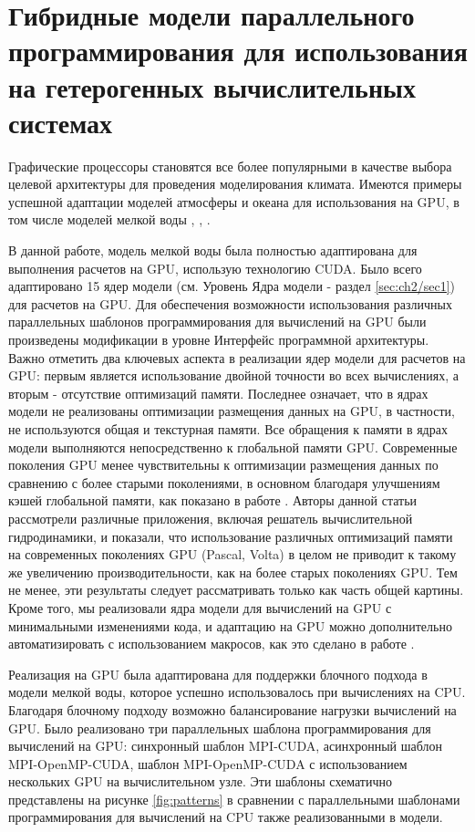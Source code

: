 \section{Гибридные модели параллельного программирования для использования на гетерогенных вычислительных системах}\label{sec:ch2/sec5}

Графические процессоры становятся все более популярными в качестве выбора целевой архитектуры для проведения моделирования климата. 
Имеются примеры успешной адаптации моделей атмосферы и океана для использования на GPU, в том числе моделей мелкой воды \cite{plosSW}, \cite{VOLNA}, \cite{gpuPOM}.

В данной работе, модель мелкой воды была полностью адаптирована для выполнения расчетов на GPU, использую технологию CUDA. 
Было всего адаптировано 15 ядер модели (см. Уровень Ядра модели - раздел \ref{sec:ch2/sec1}) для расчетов на GPU.
Для обеспечения возможности использования различных параллельных шаблонов программирования для вычислений на GPU были произведены модификации в уровне Интерфейс программной архитектуры.
Важно отметить два ключевых аспекта в реализации ядер модели для расчетов на GPU: первым является использование двойной точности во всех вычислениях, а вторым - отсутствие оптимизаций памяти.
Последнее означает, что в ядрах модели не реализованы оптимизации размещения данных на GPU, в частности, не используются общая и текстурная памяти. 
Все обращения к памяти в ядрах модели выполняются непосредственно к глобальной памяти GPU. 
Современные поколения GPU менее чувствительны к оптимизации размещения данных по сравнению с более старыми поколениями, в основном благодаря улучшениям кэшей глобальной памяти, как показано в работе \cite{CUDAopt}.
Авторы данной статьи рассмотрели различные приложения, включая решатель вычислительной гидродинамики, и показали, что использование различных оптимизаций памяти на современных поколениях GPU (Pascal, Volta) в целом не приводит к такому же увеличению производительности, как на более старых поколениях GPU.
Тем не менее, эти результаты следует рассматривать только как часть общей картины. 
Кроме того, мы реализовали ядра модели для вычислений на GPU с минимальными изменениями кода, и адаптацию на GPU можно дополнительно автоматизировать с использованием макросов, как это сделано в работе \cite{gmd-11-3447-2018}.

Реализация на GPU была адаптирована для поддержки блочного подхода в модели мелкой воды, которое успешно использовалось при вычислениях на CPU. 
Благодаря блочному подходу возможно балансирование нагрузки вычислений на GPU.
Было реализовано три параллельных шаблона программирования для вычислений на GPU: синхронный шаблон MPI-CUDA, асинхронный шаблон MPI-OpenMP-CUDA, шаблон MPI-OpenMP-CUDA с использованием нескольких GPU на вычислительном узле.
Эти шаблоны схематично представлены на рисунке \ref{fig:patterns} в сравнении с параллельными шаблонами программирования для вычислений на CPU также реализованными в модели.

